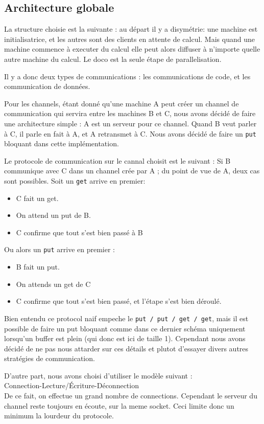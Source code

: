 \documentclass[a4paper]{article}
\begin{document}
\subsection{Architecture globale}
La structure choisie est la suivante : au départ il y a disymétrie: une
machine est initialisatrice, et les autres sont des clients en attente de
calcul. Mais quand une machine commence à executer du calcul elle peut
alors diffuser à n'importe quelle autre machine du calcul. Le doco est la seule étape de
parallelisation.

Il y a donc deux types de communications : les communications de code, et
les communication de données.


Pour les channels, étant donné qu'une machine A peut créer un channel de
communication qui servira entre les machines B et C, nous avons décidé
de faire une architecture simple : A est un serveur pour ce channel.
Quand B veut parler à C, il parle en fait à A, et A retransmet à C.
Nous avons décidé de faire un \texttt{put} bloquant dans cette implémentation.


Le protocole de communication sur le cannal choisit est le suivant : 
Si B communique avec C dans un channel crée par A ; du point de vue de A, deux cas sont
possibles. Soit un \texttt{get} arrive en premier: 
\begin{itemize}
\item C fait un get.
\item On attend un put de B.
\item C confirme que tout s'est bien passé à B 
\end{itemize}

Ou alors un \texttt{put} arrive en premier :

\begin{itemize}
\item B fait un put.
\item On attends un get de C
\item C confirme que tout s'est bien passé, et l'étape s'est bien
déroulé.
\end{itemize}

Bien entendu ce protocol naif empeche le \texttt{put / put / get / get}, mais il est
possible de faire un put bloquant comme dans ce dernier schéma
uniquement lorsqu'un buffer est plein (qui donc est ici de taille 1). Cependant nous avons décidé de ne
pas nous attarder sur ces détails et plutot d'essayer divers autres
stratégies de communication.

D'autre part, nous avons choisi d'utiliser le modèle suivant :\\
Connection-Lecture/Écriture-Déconnection \\
De ce fait, on effectue un grand nombre de connections. Cependant le
serveur du channel reste toujours en écoute, sur la meme socket. Ceci
limite donc un minimum la lourdeur du protocole.
\end{document}
